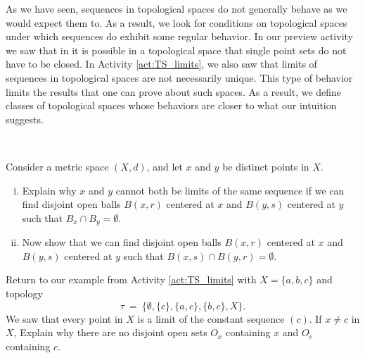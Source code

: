
As we have seen, sequences in topological spaces do not generally behave as we would expect them to. As a result, we look for conditions on topological spaces under which sequences do exhibit some regular behavior. In our preview activity we saw that in it is possible in a topological space that single point sets do not have to be closed. In Activity \ref{act:TS_limits}, we also saw that limits of sequences in topological spaces are not necessarily unique. This type of behavior limits the results that one can prove about such spaces. As a result, we define classes of topological spaces whose behaviors are closer to what our intuition suggests. 

\begin{activity} \label{act:Hausdorff} ~
\ba
\item Consider a metric space $(X,d)$, and let $x$ and $y$ be distinct points in $X$. 
	\begin{enumerate}[i.]
	\item Explain why $x$ and $y$ cannot both be limits of the same sequence if we can find disjoint open balls $B(x,r)$ centered at $x$ and $B(y,s)$ centered at $y$ such that $B_x \cap B_y = \emptyset$.
	
	\item Now show that we can find disjoint open balls $B(x,r)$ centered at $x$ and $B(y,s)$ centered at $y$ such that $B(x,s) \cap B(y,r) = \emptyset$.
	
	\end{enumerate}

\item Return to our example from Activity \ref{act:TS_limits} with $X = \{a, b, c\}$ and topology 
\[\tau~=~\{\emptyset, \{c\}, \{a, c\}, \{b, c\}, X\}.\] 
We saw that every point in $X$ is a limit of the constant sequence $(c)$. If $x \neq c$ in $X$, Explain why there are no disjoint open sets $O_x$ containing $x$ and $O_c$ containing $c$. 	

\ea

\end{activity}

